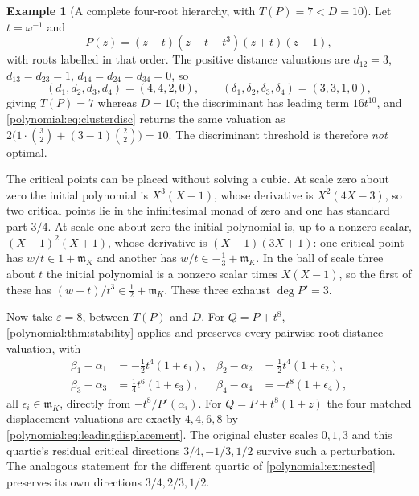 \documentclass[11pt,letterpaper]{article}
\numberwithin{equation}{section}
\theoremstyle{definition}
\newtheorem{example}[theorem]{Example}
\theoremstyle{remark}\newtheorem{remark}[theorem]{Remark}
\newcommand{\mm}{\mathfrak m}
\begin{document}
\begin{example}[A complete four-root hierarchy, with $T(P)=7<D=10$]
\label{polynomial:ex:quartic}
Let $t=\omega^{-1}$ and
\begin{equation}\label{polynomial:eq:quartic}
 P(z)=(z-t)(z-t-t^3)(z+t)(z-1),
\end{equation}
with roots labelled in that order. The positive distance valuations are
$d_{12}=3$, $d_{13}=d_{23}=1$, $d_{14}=d_{24}=d_{34}=0$, so
\begin{equation}\label{polynomial:eq:quarticdata}
 (d_1,d_2,d_3,d_4)=(4,4,2,0),\qquad
 (\delta_1,\delta_2,\delta_3,\delta_4)=(3,3,1,0),
\end{equation}
giving $T(P)=7$ whereas $D=10$; the discriminant has leading term $16t^{10}$,
and \eqref{polynomial:eq:clusterdisc} returns the same valuation as
$2\bigl(1\cdot\binom32+(3-1)\binom22\bigr)=10$. The discriminant threshold is
therefore \emph{not} optimal.

The critical points can be placed without solving a cubic. At scale zero about
zero the initial polynomial is $X^3(X-1)$, whose derivative is $X^2(4X-3)$, so
two critical points lie in the infinitesimal monad of zero and one has
standard part $3/4$. At scale one about zero the initial polynomial is, up to
a nonzero scalar, $(X-1)^2(X+1)$, whose derivative is $(X-1)(3X+1)$: one
critical point has $w/t\in1+\mm_K$ and another has $w/t\in-\tfrac13+\mm_K$. In
the ball of scale three about $t$ the initial polynomial is a nonzero scalar
times $X(X-1)$, so the first of these has $(w-t)/t^3\in\tfrac12+\mm_K$. These
three exhaust $\deg P'=3$.

Now take $\varepsilon=8$, between $T(P)$ and $D$. For $Q=P+t^8$,
\cref{polynomial:thm:stability} applies and preserves every pairwise root
distance valuation, with
\begin{align*}
 \beta_1-\alpha_1&=-\tfrac12t^4(1+\epsilon_1), &
 \beta_2-\alpha_2&=\tfrac12t^4(1+\epsilon_2),\\
 \beta_3-\alpha_3&=\tfrac14t^6(1+\epsilon_3), &
 \beta_4-\alpha_4&=-t^8(1+\epsilon_4),
\end{align*}
all $\epsilon_i\in\mm_K$, directly from $-t^8/P'(\alpha_i)$. For
$Q=P+t^8(1+z)$ the four matched displacement valuations are exactly
$4,4,6,8$ by \eqref{polynomial:eq:leadingdisplacement}. The original cluster
scales $0,1,3$ and this quartic's residual critical directions
$3/4,-1/3,1/2$ survive such a perturbation. The analogous statement for
the different quartic of \cref{polynomial:ex:nested} preserves its own
directions $3/4,2/3,1/2$.
\end{example}
\end{document}
